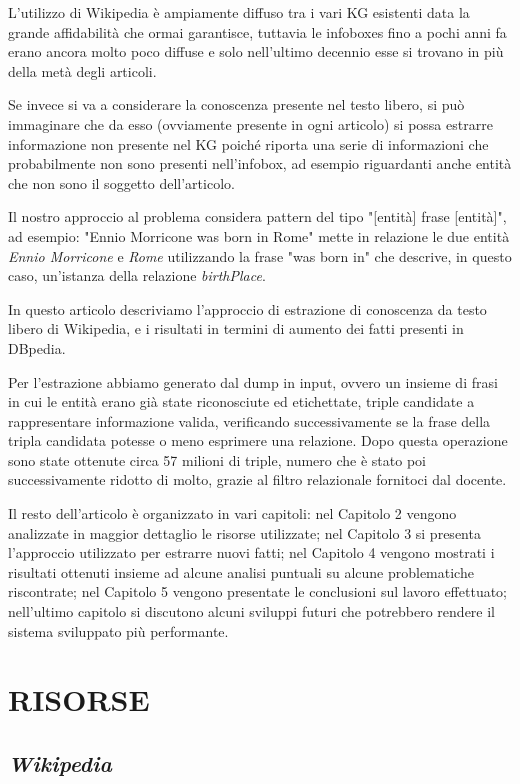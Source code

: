 \documentclass[10pt,a4paper,twocolumn]{article}
\begin{document}
L'utilizzo di Wikipedia è ampiamente diffuso tra i vari KG esistenti data la grande affidabilità che ormai garantisce, tuttavia le infoboxes fino a pochi anni fa erano ancora molto poco diffuse e solo nell'ultimo decennio esse si trovano in più della metà degli articoli.

Se invece si va a considerare la conoscenza presente nel testo libero, si può immaginare che da esso (ovviamente presente in ogni articolo) si possa estrarre informazione non presente nel KG poiché riporta una serie di informazioni che probabilmente non sono presenti nell'infobox, ad esempio riguardanti anche entità che non sono il soggetto dell'articolo.

Il nostro approccio al problema considera pattern del tipo 
"[entità] frase [entità]", ad esempio: "Ennio Morricone was born in Rome" mette in relazione le due entità \textit{Ennio Morricone} e \textit{Rome} utilizzando la frase "was born in" che descrive, in questo caso, un'istanza della relazione \textit{birthPlace}.

In questo articolo descriviamo l'approccio di estrazione di conoscenza da testo libero di Wikipedia, e i risultati in termini di aumento dei fatti presenti in DBpedia.

Per l'estrazione abbiamo generato dal dump in input, ovvero un insieme di frasi in cui le entità erano già state riconosciute ed etichettate, triple candidate a rappresentare informazione valida, verificando successivamente se la frase della tripla candidata potesse o meno esprimere una relazione. Dopo questa operazione sono state ottenute circa 57 milioni di triple, numero che è stato poi successivamente ridotto di molto, grazie al filtro relazionale fornitoci dal docente.

Il resto dell'articolo è organizzato in vari capitoli: nel Capitolo 2 vengono analizzate in maggior dettaglio le risorse utilizzate; nel Capitolo 3 si presenta l'approccio utilizzato per estrarre nuovi fatti; nel Capitolo 4 vengono mostrati i risultati ottenuti insieme ad alcune analisi puntuali su alcune problematiche riscontrate; nel Capitolo 5 vengono presentate le conclusioni sul lavoro effettuato; nell'ultimo capitolo si discutono alcuni sviluppi futuri che potrebbero rendere il sistema sviluppato più performante.

\section{RISORSE}
\subsection*{\textit{Wikipedia}}
\end{document}
